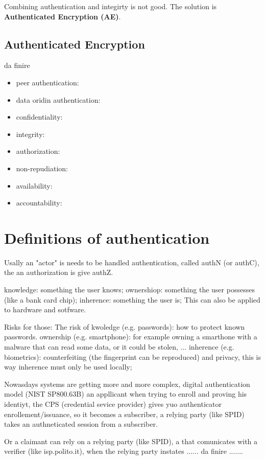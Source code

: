\documentclass[12pt]{article}
\begin{document}
Combining authentication and integirty is not good. The solution is \textbf{Authenticated Encryption (AE)}.

\subsection{Authenticated Encryption}
da finire




\begin{itemize}
    \item peer authentication: 
    \item data oridin authentication: 
    \item confidentiality:
    \item integrity:
    \item authorization:
    \item non-repudiation:
    \item availability:
    \item accountability:
\end{itemize}



\newpage
\section{Definitions of authentication}
Usally an "actor" is needs to be handled authentication, called authN (or authC), the an authorization is give authZ.

knowledge: something the user knows;
ownershiop: something the user possesses (like a bank card chip);
inherence: something the user is;
This can also be applied to hardware and sotfware.

Risks for those:
The risk of kwoledge (e.g. passwords): how to protect known passwords.
ownership (e.g. smartphone): for example owning a smarthone with a malware that can read some data, or it could be stolen, ...
inherence (e.g. biometrics): counterfeiting (the fingerprint can be reproduced) and privacy, this is way inherence must only be used locally;

Nowasdays systems are getting more and more complex, 
digital authentication model (NIST SP800.63B)
an appllicant when trying to enroll and proving his identiyt, the CPS (credential sevice provider) gives yuo authenticator enrollement/issuance, so it becomes a subscriber, a relying party (like SPID) takes an authneticated session from  a subscriber.

Or a claimant can rely on a relying party (like SPID), a that comunicates with a verifier (like isp.polito.it), when the relying party instates 
...... da finire .......
\end{document}
